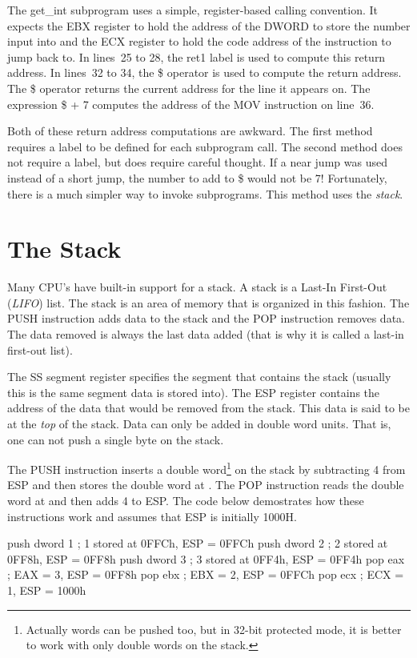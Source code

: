 The {\code get\_int} subprogram uses a simple, register-based calling
convention. It expects the EBX register to hold the address of the
DWORD to store the number input into and the ECX register to hold the
code address of the instruction to jump back to. In lines~25 to 28,
the {\code ret1} label is used to compute this return address. In
lines~32 to 34, the {\code \$} operator is used to compute the return
address. The {\code \$} operator returns the current address for the
line it appears on. The expression {\code \$ + 7} computes the address
of the {\code MOV} instruction on line~36.

Both of these return address computations are awkward. The first method
requires a label to be defined for each subprogram call. The second method
does not require a label, but does require careful thought. If a near jump
was used instead of a short jump, the number to add to {\code \$} would not
be 7! Fortunately, there is a much simpler way to invoke subprograms. This
method uses the \emph{stack}.

\section{The Stack}

Many CPU's have built-in support for a stack. A stack is a Last-In First-Out
(\emph{LIFO}) list. The stack is an area of memory that is organized in this
fashion. The {\code PUSH} instruction adds data to the stack and the
{\code POP} instruction removes data. The data removed is always the last
data added (that is why it is called a last-in first-out list).

The SS segment register specifies the segment that contains the stack (usually
this is the same segment data is stored into). The ESP register contains the
address of the data that would be removed from the stack. This data is said
to be at the \emph{top} of the stack. Data can only be added in double word
units. That is, one can not push a single byte on the stack.

The {\code PUSH} instruction inserts a double word\footnote{Actually
words can be pushed too, but in 32-bit protected mode, it is better to
work with only double words on the stack.} on the stack by subtracting
4 from ESP and then stores the double word at {\code [ESP]}. The
{\code POP} instruction reads the double word at {\code [ESP]} and
then adds 4 to ESP. The code below demostrates how these instructions
work and assumes that ESP is initially {\code 1000H}.
\begin{AsmCodeListing}[frame=none]
      push   dword 1    ; 1 stored at 0FFCh, ESP = 0FFCh
      push   dword 2    ; 2 stored at 0FF8h, ESP = 0FF8h
      push   dword 3    ; 3 stored at 0FF4h, ESP = 0FF4h
      pop    eax        ; EAX = 3, ESP = 0FF8h
      pop    ebx        ; EBX = 2, ESP = 0FFCh
      pop    ecx        ; ECX = 1, ESP = 1000h
\end{AsmCodeListing}


